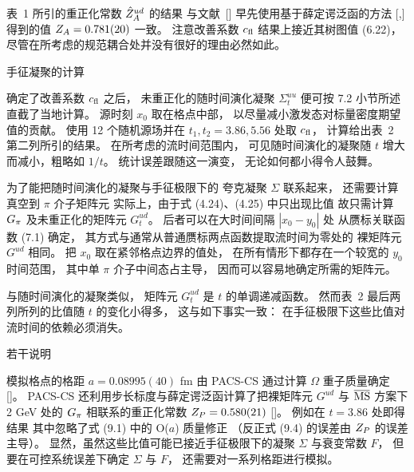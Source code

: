 

表~1 所引的重正化常数 $\hat{Z}_A^{ud}$ 的结果
与文献~[\cite{AokiEtAlIV}] 早先使用基于薛定谔泛函的方法
[\cite{ZASFI},\cite{ZASFII}]
得到的值 $Z_A=0.781(20)$ 一致。
注意改善系数 $c_{\rm fl}$ 结果上接近其树图值 (6.22)，
尽管在所考虑的规范耦合处并没有很好的理由必然如此。


 手征凝聚的计算

确定了改善系数 $c_{\rm fl}$ 之后，
未重正化的随时间演化凝聚 $\Sigma^{uu}_t$
便可按 7.2 小节所述直截了当地计算。
源时刻 $x_0$ 取在格点中部，
以尽量减小激发态对标量密度期望值的贡献。
使用 12 个随机源场并在 $t_1,t_2=3.86,5.56$ 处取 $c_{\rm fl}$，
计算给出表~2 第二列所引的结果。
在所考虑的流时间范围内，
可见随时间演化的凝聚随 $t$ 增大而减小，粗略如 $1/t$。
统计误差跟随这一演变，
无论如何都小得令人鼓舞。



为了能把随时间演化的凝聚与手征极限下的
夸克凝聚 $\Sigma$ 联系起来，
还需要计算真空到 $\pi$ 介子矩阵元
实际上，由于式 (4.24)、(4.25) 中只出现比值
故只需计算 $G_{\pi}$ 及未重正化的矩阵元 $G^{ud}_t$。
后者可以在大时间间隔 $|x_0-y_0|$ 处
从赝标关联函数 (7.1) 确定，
其方式与通常从普通赝标两点函数提取流时间为零处的
裸矩阵元 $G^{ud}$ 相同。
把 $x_0$ 取在紧邻格点边界的值处，
在所有情形下都存在一个较宽的 $y_0$ 时间范围，
其中单 $\pi$ 介子中间态占主导，
因而可以容易地确定所需的矩阵元。

与随时间演化的凝聚类似，
矩阵元 $G^{ud}_t$ 是 $t$ 的单调递减函数。
然而表~2 最后两列所列的比值随 $t$ 的变化小得多，
这与如下事实一致：
在手征极限下这些比值对流时间的依赖必须消失。


 若干说明

模拟格点的格距 $a=0.08995(40)$ fm 由 PACS-CS 通过计算
$\Omega$ 重子质量确定 [\cite{AokiEtAlII}]。
PACS-CS 还利用步长标度与薛定谔泛函计算了把裸矩阵元 $G^{ud}$
与 $\MSbar$ 方案下 2 GeV 处的 $G_{\pi}$ 相联系的重正化常数
$Z_P=0.580(21)$ [\cite{AokiEtAlIV}]\kern1pt。
例如在 $t=3.86$ 处即得结果
其中忽略了式 (9.1) 中的 O($a$) 质量修正
（反正式 (9.4) 的误差由 $Z_P$ 的误差主导）。
显然，虽然这些比值可能已接近手征极限下的凝聚 $\Sigma$
与衰变常数 $F$，
但要在可控系统误差下确定 $\Sigma$ 与 $F$，
还需要对一系列格距进行模拟。

